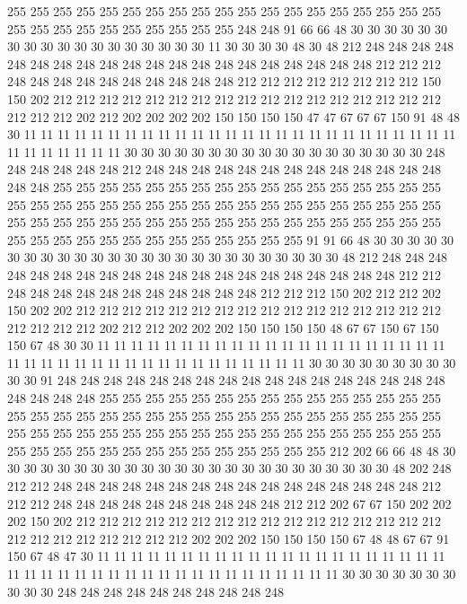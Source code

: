 255 255 255 255 255 255 255 255 255 255 255 255 255 255 255 255 255 255 255 255
255 255 255 255 255 255 255 255 255 248 248 91 66 66 48 30 30 30 30 30
30 30 30 30 30 30 30 30 30 30 30 30 30 11 30 30 30 30 48 30
48 212 248 248 248 248 248 248 248 248 248 248 248 248 248 248 248 248 248 248
248 248 212 212 212 248 248 248 248 248 248 248 248 248 248 212 212 212 212 212
212 212 212 150 150 202 212 212 212 212 212 212 212 212 212 212 212 212 212 212
212 212 212 212 212 212 202 212 202 202 202 202 150 150 150 150 47 47 67 67
67 150 91 48 48 30 11 11 11 11 11 11 11 11 11 11 11 11 11 11
11 11 11 11 11 11 11 11 11 11 11 11 11 11 11 11 11 11 11 30
30 30 30 30 30 30 30 30 30 30 30 30 30 30 30 30 30 248 248 248
248 248 248 212 248 248 248 248 248 248 248 248 248 248 248 248 248 248 248 255
255 255 255 255 255 255 255 255 255 255 255 255 255 255 255 255 255 255 255 255
255 255 255 255 255 255 255 255 255 255 255 255 255 255 255 255 255 255 255 255
255 255 255 255 255 255 255 255 255 255 255 255 255 255 255 255 255 255 255 255
255 255 255 255 255 255 255 91 91 66 48 30 30 30 30 30 30 30 30 30
30 30 30 30 30 30 30 30 30 30 30 30 30 30 30 30 48 212 248 248
248 248 248 248 248 248 248 248 248 248 248 248 248 248 248 248 248 248 212 212
248 248 248 248 248 248 248 248 248 248 248 212 212 212 150 202 212 212 202 150
202 202 212 212 212 212 212 212 212 212 212 212 212 212 212 212 212 212 212 212
212 212 202 212 212 202 202 202 150 150 150 150 48 67 67 150 67 150 150 67
48 30 30 11 11 11 11 11 11 11 11 11 11 11 11 11 11 11 11 11
11 11 11 11 11 11 11 11 11 11 11 11 11 11 11 11 11 11 11 11
11 11 30 30 30 30 30 30 30 30 30 30 30 91 248 248 248 248 248 248
248 248 248 248 248 248 248 248 248 248 248 248 248 248 248 255 255 255 255 255
255 255 255 255 255 255 255 255 255 255 255 255 255 255 255 255 255 255 255 255
255 255 255 255 255 255 255 255 255 255 255 255 255 255 255 255 255 255 255 255
255 255 255 255 255 255 255 255 255 255 255 255 255 255 255 255 255 255 255 255
255 255 212 202 66 66 48 48 30 30 30 30 30 30 30 30 30 30 30 30
30 30 30 30 30 30 30 30 30 30 30 30 48 202 248 212 212 248 248 248
248 248 248 248 248 248 248 248 248 248 248 248 248 212 212 212 248 248 248 248
248 248 248 248 248 248 212 212 202 67 67 150 202 202 202 150 202 212 212 212
212 212 212 212 212 212 212 212 212 212 212 212 212 212 212 212 212 212 212 212
212 202 202 202 150 150 150 150 67 48 48 67 67 91 150 67 48 47 30 11
11 11 11 11 11 11 11 11 11 11 11 11 11 11 11 11 11 11 11 11
11 11 11 11 11 11 11 11 11 11 11 11 11 11 11 11 11 11 11 11
30 30 30 30 30 30 30 30 30 30 248 248 248 248 248 248 248 248 248 248
